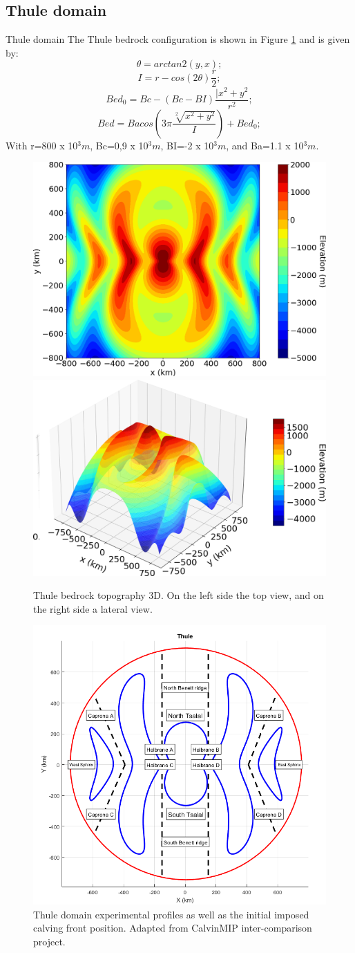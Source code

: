 \documentclass[11pt]{beamer}
\begin{document}
	\subsection{Thule domain}
		\begin{frame}[allowframebreaks]{Thule domain}
			The Thule bedrock configuration is shown in Figure \ref{Thule_3D} and is given by:
			\begin{equation}
				\theta=arctan2(y,x);
			\end{equation}
			\begin{equation}
				I=r-cos(2\theta)\frac{r}{2};
			\end{equation}
			\begin{equation}
				Bed_0=Bc-(Bc-BI)\frac{|x^2+y^2}{r^2};
			\end{equation}
			\begin{equation}
				Bed=Bacos(3\pi\frac{\sqrt[2]{x^2+y^2}}{I})+Bed_0;
			\end{equation}
			With r=800 x 10$^3 m$, Bc=0,9 x 10$^3 m$, BI=-2 x 10$^3 m$, and Ba=1.1 x 10$^3 m$.
			\begin{figure}[!h]
				\centering
				\includegraphics[width=0.45\linewidth]{../fig/Thule_2D}
				\includegraphics[width=0.45\linewidth]{../fig/Thule_3D}
				\caption{Thule bedrock topography 3D. On the left side the top view, and on the right side a lateral view.}
				\label{Thule_3D}
			\end{figure}
			\begin{figure}
				\centering
				\includegraphics[width=0.5\linewidth]{../fig/thule.png}
				\caption{Thule domain experimental profiles as well as the initial imposed calving front position. Adapted from CalvinMIP inter-comparison project.}
				\label{thule_profile}
			\end{figure}
		\end{frame}
\end{document}
